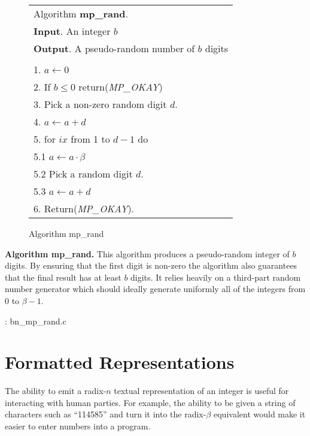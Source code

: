 \documentclass[b5paper]{book}
\begin{document}
\newpage\begin{figure}[!here]
\begin{small}
\begin{center}
\begin{tabular}{l}
\hline Algorithm \textbf{mp\_rand}. \\
\textbf{Input}.   An integer $b$ \\
\textbf{Output}.  A pseudo-random number of $b$ digits \\
\hline \\
1.  $a \leftarrow 0$ \\
2.  If $b \le 0$ return(\textit{MP\_OKAY}) \\
3.  Pick a non-zero random digit $d$. \\
4.  $a \leftarrow a + d$ \\
5.  for $ix$ from 1 to $d - 1$ do \\
\hspace{3mm}5.1  $a \leftarrow a \cdot \beta$ \\
\hspace{3mm}5.2  Pick a random digit $d$. \\
\hspace{3mm}5.3  $a \leftarrow a + d$ \\
6.  Return(\textit{MP\_OKAY}). \\
\hline
\end{tabular}
\end{center}
\end{small}
\caption{Algorithm mp\_rand}
\end{figure}
\textbf{Algorithm mp\_rand.}
This algorithm produces a pseudo-random integer of $b$ digits.  By ensuring that the first digit is non-zero the algorithm also guarantees that the
final result has at least $b$ digits.  It relies heavily on a third-part random number generator which should ideally generate uniformly all of
the integers from $0$ to $\beta - 1$.  

\vspace{+3mm}\begin{small}
\hspace{-5.1mm}{\bf File}: bn\_mp\_rand.c
\vspace{-3mm}
\begin{alltt}
\end{alltt}
\end{small}

\section{Formatted Representations}
The ability to emit a radix-$n$ textual representation of an integer is useful for interacting with human parties.  For example, the ability to
be given a string of characters such as ``114585'' and turn it into the radix-$\beta$ equivalent would make it easier to enter numbers
into a program.
\end{document}
